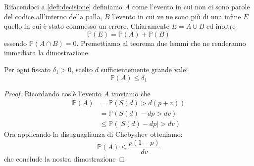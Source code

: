 Rifacendoci a \ref{defi:decisione} definiamo $A$ come l'evento in cui non ci sono parole del codice all'interno della palla, $B$ l'evento in cui ve ne sono più di una infine $E$ quello in cui è stato commesso un errore. Chiaramente $E=A\cup B$ ed inoltre 
\begin{equation}\label{eq:7.7}
\mathbb{P}(E)=\mathbb{P}(A)+ \mathbb{P}(B)
\end{equation}
essendo $\mathbb{P}(A \cap B)=0$.
Premettiamo al teorema due lemmi che ne renderanno immediata la dimostrazione.

\begin{lem}
Per ogni fissato $\delta_1>0$, scelto $d$ sufficientemente grande vale:
$$\mathbb{P}(A)\leq \delta_1$$   
\end{lem}
\begin{proof}
Ricordando cos'è l'evento $A$ troviamo che 	
 \[
\begin{split}
\mathbb{P}(A)&=\mathbb{P}(S(d)>d(p+v))\\
& = \mathbb{P}(S(d)-dp>dv)\\
& \leq \mathbb{P}(|S(d)-dp|>dv)
\end{split}
\]
Ora applicando la disuguaglianza di Chebyshev otteniamo:
$$\mathbb{P}(A)\leq \frac{p(1-p)}{dv}$$
che conclude la nostra dimostrazione
\end{proof}

